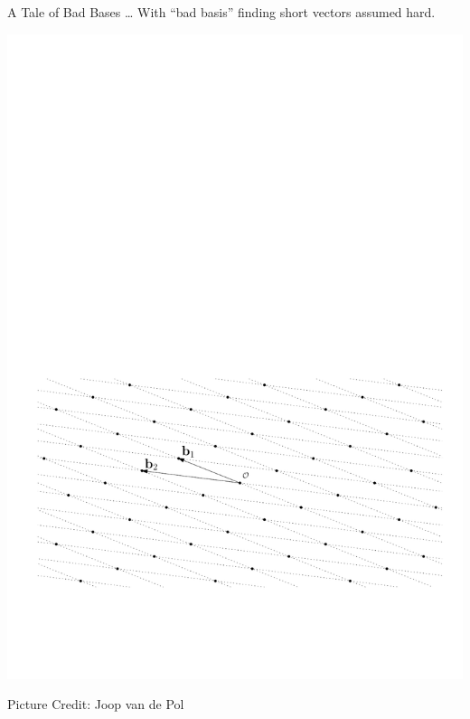 \documentclass[xcolor=table,10pt,aspectratio=169]{beamer}
\begin{document}
\begin{frame}[label={sec:orgdb8c34e}]{A Tale of Bad Bases …}
With “bad basis” finding short vectors assumed hard.

\begin{center}
\includegraphics[width=0.8\linewidth]{./joop-latt2a.pdf}
\end{center}

\tiny Picture Credit: Joop van de Pol
\end{frame}
\end{document}
